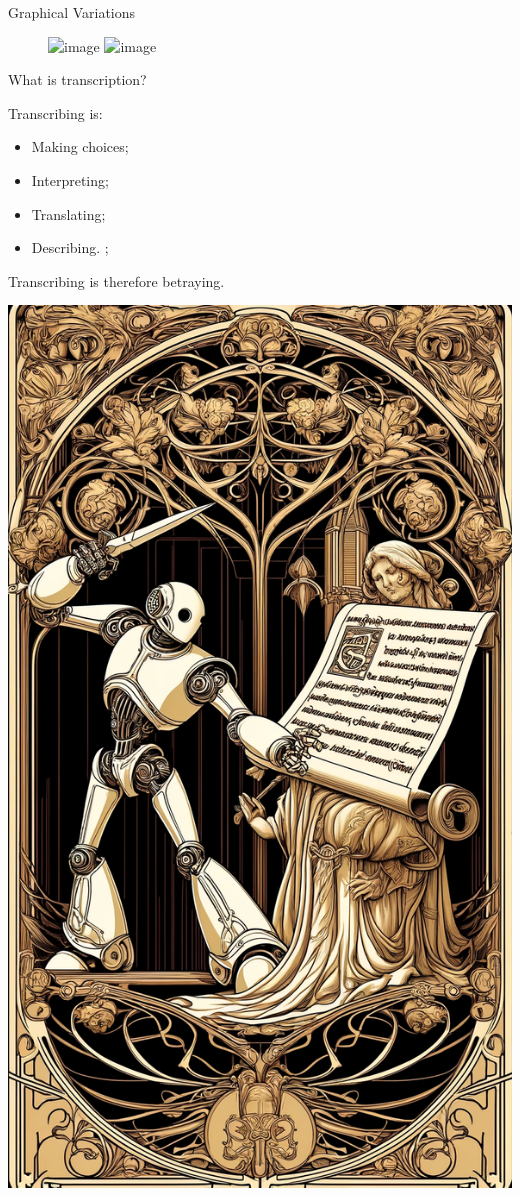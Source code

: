 \documentclass[aspectratio=169]{beamer}
\begin{document}
\begin{frame}{Graphical Variations}
    \begin{figure}
        \centering
        \includegraphics<1>[width=\linewidth]{cv-for-ch/images/Scripts.png}
        \includegraphics<2>[width=\linewidth]{cv-for-ch/images/Diversity.png}
    \end{figure}
    
\end{frame}
\begin{frame}{What is transcription?}

\begin{minipage}{.45\textwidth}
    Transcribing is: 
    \begin{itemize}
        \item Making choices;
        \item Interpreting;
        \item Translating;
        \item Describing.
        ;
    \end{itemize} 
    Transcribing is therefore betraying.
\end{minipage}\hfill
\begin{minipage}{.35\textwidth}
    \centering
    \vspace{1em}
    \includegraphics[width=.8\linewidth]{cv-for-ch/images/Trahir.png}
\end{minipage}


\end{frame}
\end{document}

